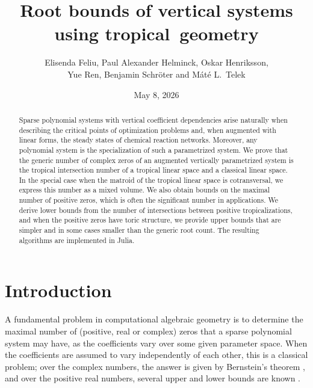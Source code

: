 \documentclass[11pt,reqno,a4paper]{amsart}
\numberwithin{equation}{section}
\theoremstyle{theoremstyle}
\theoremstyle{examplestyle}
\begin{document}
\title{
Root bounds of vertical systems\\ using tropical~geometry
}

\author[Elisenda Feliu, Paul Alexander Helminck, Oskar Henriksson, Yue Ren, Benjamin Schröter and Máté L.\, Telek]{Elisenda Feliu, Paul Alexander Helminck, Oskar Henriksson,\\ Yue Ren, Benjamin Schröter and Máté L.~Telek}

\date{May 8, 2026}
 
\begin{abstract}
Sparse polynomial systems with vertical coefficient dependencies arise naturally when describing the critical points of optimization problems and, when augmented with linear forms, the steady states of chemical reaction networks.
Moreover, any polynomial system is the specialization of such a parametrized system.
We prove that the generic number of complex zeros of an augmented vertically parametrized system is the tropical intersection number of a tropical linear space and a classical linear space.
In the special case when the matroid of the tropical linear space is cotransversal, we express this number as a mixed volume.
We also obtain bounds on the maximal number of positive zeros, which is often the significant number in applications. We derive lower bounds from the number of intersections between positive tropicalizations, and when the positive zeros have  toric structure, we provide upper bounds that are simpler and in some cases smaller than the generic root count. 
The resulting algorithms are implemented in Julia. 
\end{abstract}

\maketitle



\section{Introduction}
\noindent A fundamental problem in computational algebraic geometry is to determine the maximal number of (positive, real or complex) zeros that a sparse polynomial system may have, as the coefficients vary over some given parameter space. When the coefficients are assumed to vary independently of each other, this is a classical problem; over the complex numbers, the answer is given by Bernstein's theorem \cite{Bernstein1975}, and over the positive real numbers, several upper and lower bounds are known \cite{Sottile-book,BihanDickensteinGiaroli2020,BihanDickensteinForsgaard2021}.
\end{document}
